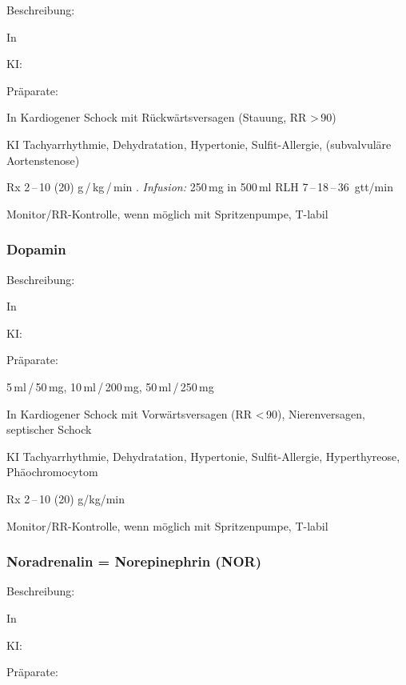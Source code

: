 \begin{labeling}[:]{mm}
  \item[Beschreibung:]
  \item[In]
  \item[KI:]
  \item[Präparate:]


\item[In]Kardiogener Schock mit Rückwärtsversagen
(Stauung, RR {\textgreater}\,90)


\item[KI]Tachyarrhythmie, Dehydratation,
Hypertonie, Sulfit-Allergie, (subvalvuläre Aortenstenose)


\item[Rx] 2\,--\,10 (20) {\textmu}g\,/\,kg\,/\,min .
\textit{Infusion: }250\,mg in 500\,ml RLH 7\,--\,18\,--\,36~gtt/min


Monitor/RR-Kontrolle, wenn möglich mit Spritzenpumpe,
T{\textdegree}-labil


\end{labeling}


\subsubsection{Dopamin }
\begin{labeling}[:]{mm}
  \item[Beschreibung:]
  \item[In]
  \item[KI:]
  \item[Präparate:]

5\,ml\,/\,50\,mg, 10\,ml\,/\,200\,mg, 50\,ml\,/\,250\,mg

\item[In]Kardiogener Schock mit Vorwärtsversagen
(RR {\textless}\,90), Nierenversagen, septischer Schock

\item[KI] Tachyarrhythmie, Dehydratation, Hypertonie,
Sulfit-Allergie, Hyperthyreose, Phäochromocytom

\item[Rx] 2\,--\,10 (20) {\textmu}g/kg/min

Monitor/RR-Kontrolle, wenn möglich mit Spritzenpumpe,
T{\textdegree}-labil
\end{labeling}

\subsubsection{Noradrenalin = Norepinephrin (NOR)}
\begin{labeling}[:]{mm}
  \item[Beschreibung:]
  \item[In]
  \item[KI:]
  \item[Präparate:]
\end{labeling}


